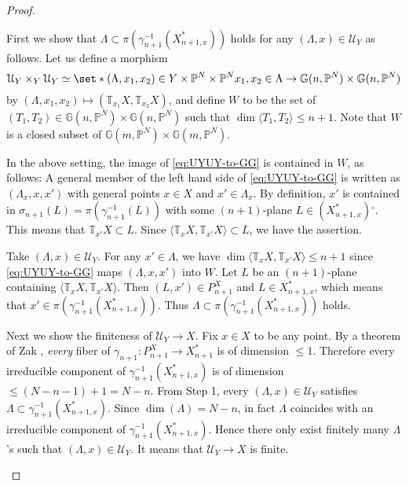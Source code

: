 \documentclass[a4paper,12pt]{amsart}
\theoremstyle{plain}
\theoremstyle{definition}
\begin{document}
\begin{proof}
  \begin{inparaenum}
  \item 
    First we show that $\Lambda \subset \pi(\gamma_{n+1}^{-1}(X_{n+1,x}^*))$ holds
    for  any $(\Lambda,x) \in {\mathcal {U}}_Y$   as follows.
    Let us define a morphism
    \begin{equation}\label{eq:UYUY-to-GG}
      {\mathcal {U}}_Y \times_Y {\mathcal {U}}_Y \simeq \set*{(\Lambda, x_1,x_2) \in Y \times {{\mathbb{P}}^N} \times {{\mathbb{P}}^N}}{x_1,x_2 \in \Lambda}
      \rightarrow {{\mathbb{G}}(n,{{\mathbb{P}}^N})} \times {{\mathbb{G}}(n,{{\mathbb{P}}^N})}
    \end{equation}
    by $(\Lambda, x_1,x_2) \mapsto ({\mathbb{T}}_{x_1}X, {\mathbb{T}}_{x_2}X)$, and define $W$ to be the set of
    $(T_1,T_2) \in {{\mathbb{G}}(n,{{\mathbb{P}}^N})} \times {{\mathbb{G}}(n,{{\mathbb{P}}^N})}$ such that $\dim {\langle {T_1, T_2} \rangle} {\leqslant} n+1$. Note that $W$ is a closed subset of ${{\mathbb{G}}(m,{{\mathbb{P}}^N})} \times {{\mathbb{G}}(m,{{\mathbb{P}}^N})}$.

    In the above setting, the image of \ref{eq:UYUY-to-GG} is contained in $W$, as follows:
    A general member of the left hand side of \ref{eq:UYUY-to-GG}
    is written as $(\Lambda_x, x,x')$ with general points $x \in X$ and $x' \in \Lambda_x$.
    By definition, $x'$ is contained in $\sigma_{n+1}(L) = \pi(\gamma_{n+1}^{-1}(L))$
    with some $(n+1)$-plane $L \in (X_{n+1,x}^*){^\circ}$.
    This means that ${\mathbb{T}}_{x'}X \subset L$.
    Since ${\langle {{\mathbb{T}}_{x}X, {\mathbb{T}}_{x'}X} \rangle} \subset L$, we have the assertion.

    Take $(\Lambda,x) \in {\mathcal {U}}_Y$.   For any $x' \in \Lambda$, we have $\dim{\langle {{\mathbb{T}}_{x}X, {\mathbb{T}}_{x'}X} \rangle} {\leqslant} n+1$
    since \ref{eq:UYUY-to-GG} maps $(\Lambda, x,x')$ into $W$.
    Let $L$ be an $(n+1)$-plane containing ${\langle {{\mathbb{T}}_{x}X, {\mathbb{T}}_{x'}X} \rangle}$.
    Then $(L,x') \in P_{n+1}^X$ and $L \in X_{n+1,x}^*$, which means that
    $x' \in \pi(\gamma_{n+1}^{-1}(X_{n+1,x}^*))$.
    Thus $\Lambda \subset \pi(\gamma_{n+1}^{-1}(X_{n+1,x}^*))$ holds.
    \vspace{2mm}

  \item 
    Next we show the finiteness of ${\mathcal {U}}_Y \rightarrow X$.
    Fix $x \in X$ to be any point.
    By a theorem of Zak \cite[I, 2.3 Theorem]{Zak}, 
    \emph{every} fiber of $\gamma_{n+1}:P_{n+1}^X \rightarrow X_{n+1}^*$ is of dimension ${\leqslant} 1$.
    Therefore every irreducible component of $\gamma_{n+1}^{-1}(X_{n+1,x}^*)$
    is of dimension ${\leqslant} (N-n-1)+1 = N-n$.
    From Step 1, every $(\Lambda,x) \in {\mathcal {U}}_Y$ satisfies $\Lambda \subset \gamma_{n+1}^{-1}(X_{n+1,x}^*)$. Since $\dim(\Lambda) = N-n$, in fact $\Lambda$ coincides with an irreducible component of $\gamma_{n+1}^{-1}(X_{n+1,x}^*)$. Hence there only exist finitely many $\Lambda$'s such that $(\Lambda, x) \in {\mathcal {U}}_Y$. It means that
    ${\mathcal {U}}_Y \rightarrow X$ is finite.


\end{inparaenum}
\end{proof}
\end{document}
